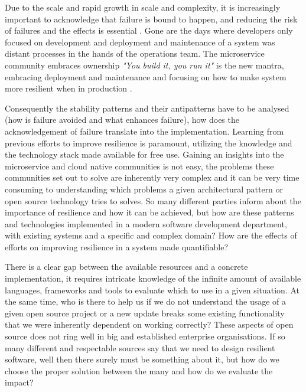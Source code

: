 Due to the scale and rapid growth in scale and complexity, it is increasingly important to acknowledge that failure is bound to happen, and reducing the risk of failures and the effects is essential \cite{abid2014toward} \cite[p. 117]{nygard2007release} \cite{tseitlin2013antifragile} \cite{krishnan2012weathering}. Gone are the days where developers only focused on development and deployment and maintenance of a system was distant processes in the hands of the operations team. The microservice community embraces ownership \textit{"You build it, you run it"} \cite{gray2006conversation} is the new mantra, embracing deployment and maintenance and focusing on how to make system more resilient when in production \cite[p.~6]{nygard2007release}. 

Consequently the stability patterns and their antipatterns have to be analysed (how is failure avoided and what enhances failure), how does the acknowledgement of failure translate into the implementation. Learning from previous efforts to improve resilience is paramount, utilizing the knowledge and the technology stack made available for free use. Gaining an insights into the microservice and cloud native communities is not easy, the problems these communities set out to solve are inherently very complex and it can be very time consuming to understanding which problems a given architectural pattern or open source technology tries to solves. So many different parties inform about the importance of resilience and how it can be achieved, but how are these patterns and technologies implemented in a modern software development department, with existing systems and a specific and complex domain? How are the effects of efforts on improving resilience in a system made quantifiable?

There is a clear gap between the available resources and a concrete implementation, it requires intricate knowledge of the infinite amount of available languages, frameworks and tools to evaluate which to use in a given situation. 
At the same time, who is there to help us if we do not understand the usage of a given open source project or a new update breaks some existing functionality that we were inherently dependent on working correctly? These aspects of open source does not ring well in big and established enterprise organisations. If so many different and respectable sources say that we need to design resilient software, well then there surely must be something about it, but how do we choose the proper solution between the many and how do we evaluate the impact?

